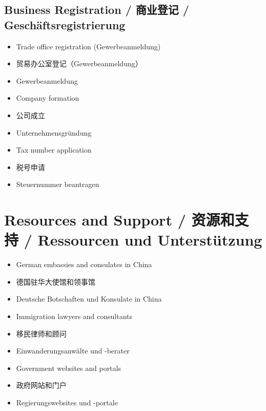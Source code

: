 \subsection{Business Registration / 商业登记 / Geschäftsregistrierung}
\begin{itemize}
    \item Trade office registration (Gewerbeanmeldung)
    \item 贸易办公室登记（Gewerbeanmeldung）
    \item Gewerbeanmeldung
    \item Company formation
    \item 公司成立
    \item Unternehmensgründung
    \item Tax number application
    \item 税号申请
    \item Steuernummer beantragen
\end{itemize}

\section{Resources and Support / 资源和支持 / Ressourcen und Unterstützung}

\begin{itemize}
    \item German embassies and consulates in China
    \item 德国驻华大使馆和领事馆
    \item Deutsche Botschaften und Konsulate in China
    \item Immigration lawyers and consultants
    \item 移民律师和顾问
    \item Einwanderungsanwälte und -berater
    \item Government websites and portals
    \item 政府网站和门户
    \item Regierungswebsites und -portale
\end{itemize}
